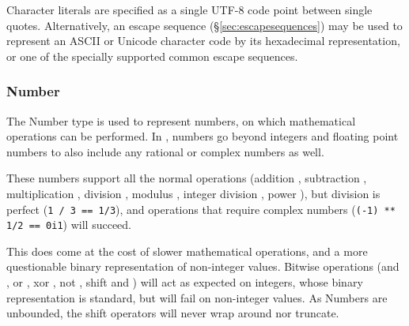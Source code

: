 Character literals are specified as a single UTF-8 code point between
single quotes. Alternatively, an escape sequence (\S\ref{sec:escapesequences})
may be used to represent an ASCII or Unicode character code by its hexadecimal
representation, or one of the specially supported common escape sequences.

\subsubsection{Number}

The Number type is used to represent numbers, on which mathematical
operations can be performed. In \Trilogy{}, numbers go beyond integers
and floating point numbers to also include any rational or complex
numbers as well.

These numbers support all the normal operations (addition \op{+},
subtraction \op{-}, multiplication \op{*}, division \op{/},
modulus \op{\%}, integer division \op{//}, power \op{**}), but
division is perfect (\texttt{1 / 3 == 1/3}), and operations that
require complex numbers (\texttt{(-1) ** 1/2 == 0i1}) will succeed.

This does come at the cost of slower mathematical operations, and a
more questionable binary representation of non-integer values. Bitwise
operations (and \op{\&}, or \op{|}, xor \op{\textasciicircum}, not
\op{\textasciitilde}, shift \op{\textasciitilde>} and \op{<\textasciitilde})
will act as expected on integers, whose binary representation is
standard, but will fail on non-integer values. As Numbers are unbounded,
the shift operators will never wrap around nor truncate.
